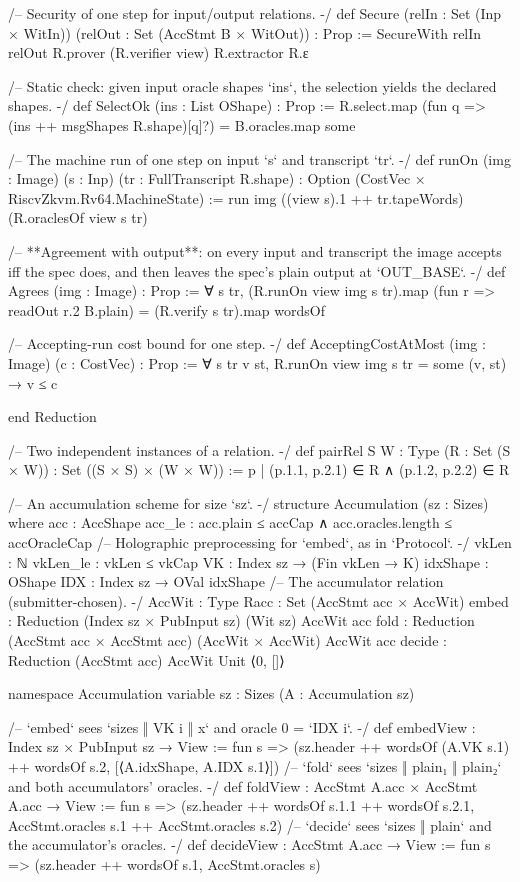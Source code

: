 \begin{leancode}[fontsize=\scriptsize,label={\footnotesize Contract/Accumulation.lean}]
/-- Security of one step for input/output relations. -/
def Secure (relIn : Set (Inp × WitIn)) (relOut : Set (AccStmt B × WitOut)) : Prop :=
  SecureWith relIn relOut R.prover (R.verifier view) R.extractor R.ε

/-- Static check: given input oracle shapes `ins`, the selection yields the declared shapes. -/
def SelectOk (ins : List OShape) : Prop := R.select.map (fun q => (ins ++ msgShapes R.shape)[q]?) =
    B.oracles.map some

/-- The machine run of one step on input `s` and transcript `tr`. -/
def runOn (img : Image) (s : Inp) (tr : FullTranscript R.shape) : Option (CostVec × RiscvZkvm.Rv64.MachineState)
    :=
  run img ((view s).1 ++ tr.tapeWords) (R.oraclesOf view s tr)

/-- **Agreement with output**: on every input and transcript the image accepts iff the spec
does, and then leaves the spec's plain output at `OUT_BASE`. -/
def Agrees (img : Image) : Prop :=
  ∀ s tr, (R.runOn view img s tr).map (fun r => readOut r.2 B.plain) = (R.verify s tr).map wordsOf

/-- Accepting-run cost bound for one step. -/
def AcceptingCostAtMost (img : Image) (c : CostVec) : Prop :=
  ∀ s tr v st, R.runOn view img s tr = some (v, st) → v ≤ c

end Reduction

/-- Two independent instances of a relation. -/
def pairRel {S W : Type} (R : Set (S × W)) : Set ((S × S) × (W × W)) :=
  {p | (p.1.1, p.2.1) ∈ R ∧ (p.1.2, p.2.2) ∈ R}

/-- An accumulation scheme for size `sz`. -/
structure Accumulation (sz : Sizes) where
  acc : AccShape
  acc_le : acc.plain ≤ accCap ∧ acc.oracles.length ≤ accOracleCap
  /-- Holographic preprocessing for `embed`, as in `Protocol`. -/
  vkLen : ℕ
  vkLen_le : vkLen ≤ vkCap
  VK : Index sz → (Fin vkLen → K)
  idxShape : OShape
  IDX : Index sz → OVal idxShape
  /-- The accumulator relation (submitter-chosen). -/
  AccWit : Type
  Racc : Set (AccStmt acc × AccWit)
  embed : Reduction (Index sz × PubInput sz) (Wit sz) AccWit acc
  fold : Reduction (AccStmt acc × AccStmt acc) (AccWit × AccWit) AccWit acc
  decide : Reduction (AccStmt acc) AccWit Unit ⟨0, []⟩

namespace Accumulation
variable {sz : Sizes} (A : Accumulation sz)

/-- `embed` sees `sizes ‖ VK i ‖ x` and oracle 0 = `IDX i`. -/
def embedView : Index sz × PubInput sz → View :=
  fun s => (sz.header ++ wordsOf (A.VK s.1) ++ wordsOf s.2, [⟨A.idxShape, A.IDX s.1⟩])
/-- `fold` sees `sizes ‖ plain₁ ‖ plain₂` and both accumulators' oracles. -/
def foldView : AccStmt A.acc × AccStmt A.acc → View :=
  fun s => (sz.header ++ wordsOf s.1.1 ++ wordsOf s.2.1, AccStmt.oracles s.1 ++ AccStmt.oracles s.2)
/-- `decide` sees `sizes ‖ plain` and the accumulator's oracles. -/
def decideView : AccStmt A.acc → View := fun s => (sz.header ++ wordsOf s.1, AccStmt.oracles s)


\end{leancode}
